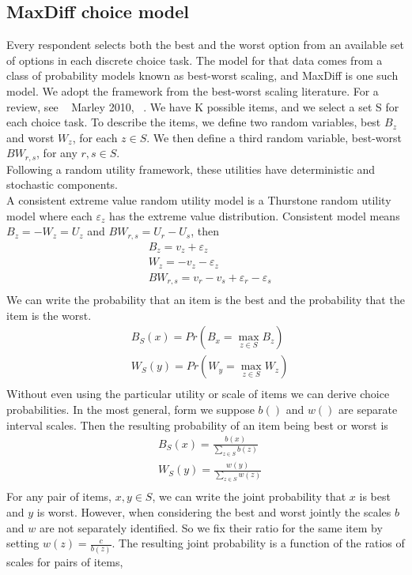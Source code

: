 \documentclass[nonblindrev]{informs3}
\begin{document}
\subsection{MaxDiff choice model}
Every respondent selects both the best and the worst option from an available set of options in each discrete choice task. The model for that data comes from a class of probability models known as best-worst scaling, and MaxDiff is one such model. We adopt the framework from the best-worst scaling literature. For a review, see ~\cite{marley2012models} Marley 2010, ~\cite{marley2005some}. 
We have K possible items, and we select a set S for each choice task. To describe the items, we define two random variables, best $B_z$ and worst $W_z$, for each $z \in S$.  We then define a third random variable, best-worst $BW_{r,s}$, for any $r,s \in S$.\\
Following a random utility framework, these utilities have deterministic and stochastic components.\\ 
A consistent extreme value random utility model is a Thurstone random utility model where each $\varepsilon_z$ has the extreme value distribution. Consistent model means $B_z=-W_z=U_z$ and $BW_{r,s}=U_r-U_s$, then
\begin{align*}
&B_z=v_z+\varepsilon_z\\
&W_z=-v_z-\varepsilon_z\\
&BW_{r,s}=v_r-v_s+\varepsilon_r-\varepsilon_s\\
\end{align*}
We can write the probability that an item is the best and the probability that the item is the worst.
\begin{align*}
&B_S (x)= Pr⁡( B_x=\max_{z \in S} B_z)\\
&W_S (y)= Pr⁡( W_y=\max_{z \in S} W_z)\\
\end{align*}
Without even using the particular utility or scale of items we can derive choice probabilities. In the most general, form we suppose $b()$ and $w()$ are separate interval scales. Then the resulting probability of an item being best or worst is
\begin{align*}
&B_S (x)= \frac{b(x)}{\sum_{z \in S}b(z)}\\
&W_S (y)= \frac{w(y)}{\sum_{z \in S}w(z)}\\
\end{align*}
For any pair of items, $x,y \in S$, we can write the joint probability that $x$ is best and $y$ is worst. However, when considering the best and worst jointly the scales $b$ and $w$ are not separately identified. So we fix their ratio for the same item by setting $w(z)=\frac{c}{b(z)}$. The resulting joint probability is a function of the ratios of scales for pairs of items, 
\end{document}
